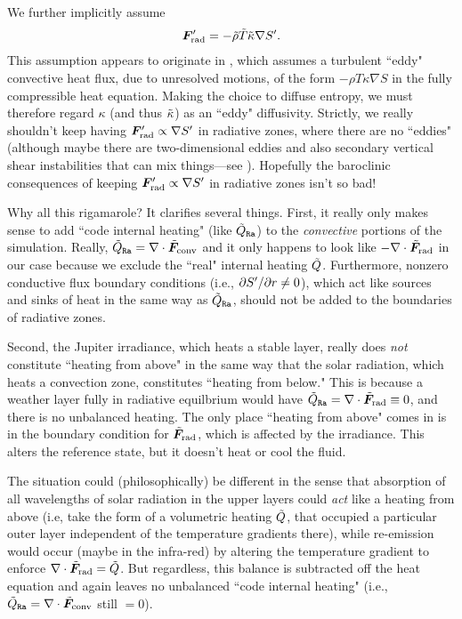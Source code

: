 \documentclass[12pt]{article}
\numberwithin{equation}{section}
\begin{document}
We further implicitly assume
\begin{align}
\bm{F}^\prime_{\rm rad}=-\tilde{\rho} \tilde{T} \tilde{\kappa} \nabla {S^\prime}.
\end{align}
This assumption appears to originate in \citet{Gilman1981}, which assumes a turbulent ``eddy" convective heat flux, due to unresolved motions, of the form $-\rho T\kappa\nabla S$ in the fully compressible heat equation. Making the choice to diffuse entropy, we must therefore regard $\kappa$ (and thus $\tilde{\kappa}$) as an ``eddy" diffusivity. Strictly, we really shouldn't keep having $\bm{F}^\prime_{\rm rad}\propto\nabla{S^\prime}$ in radiative zones, where there are no ``eddies" (although maybe there are two-dimensional eddies and also secondary vertical shear instabilities that can mix things---see \citealt{Cope2020,Garaud2020}). Hopefully the baroclinic consequences of keeping $\bm{F}^\prime_{\rm rad}\propto\nabla{S^\prime}$ in radiative zones isn't so bad!

Why all this rigamarole? It clarifies several things. First, it really only makes sense to add ``code internal heating" (like $\tilde{Q}_{\texttt{Ra}}$) to the \textit{convective} portions of the simulation. Really, $\tilde{Q}_{\texttt{Ra}}=\nabla\cdot\tilde{\bm{F}}_{\rm conv}$ and it only happens to look like $-\nabla\cdot\tilde{\bm{F}}_{\rm rad}$ in our case because we exclude the ``real" internal heating $\tilde{Q}$. Furthermore, nonzero conductive flux boundary conditions (i.e., $\partial{S^\prime}/\partial r\neq0$), which act like sources and sinks of heat in the same way as $\tilde{Q}_{\texttt{Ra}}$, should not be added to the boundaries of radiative zones. %

Second, the Jupiter irradiance, which heats a stable layer, really does \textit{not} constitute ``heating from above" in the same way that the solar radiation, which heats a convection zone, constitutes ``heating from below." This is because a weather layer fully in radiative equilbrium would have $\tilde{Q}_{\texttt{Ra}}=\nabla\cdot\tilde{\bm{F}}_{\rm rad}\equiv0$, and there is no unbalanced heating. The only place ``heating from above" comes in is in the boundary condition for $\tilde{\bm{F}}_{\rm rad}$, which is affected by the irradiance. This alters the reference state, but it doesn't heat or cool the fluid. 

The situation could (philosophically) be different in the sense that absorption of all wavelengths of solar radiation in the upper layers could \textit{act} like a heating from above (i.e, take the form of a volumetric heating $\tilde{Q}$, that occupied a particular outer layer independent of the temperature gradients there), while re-emission would occur (maybe in the infra-red) by altering the temperature gradient to enforce $\nabla\cdot\tilde{\bm{F}}_{\rm rad}=\tilde{Q}$. But regardless, this balance is subtracted off the heat equation and again leaves no unbalanced ``code internal heating" (i.e., $\tilde{Q}_{\texttt{Ra}}=\nabla\cdot\tilde{\bm{F}}_{\rm conv}$ still $=0$).  %
\end{document}
